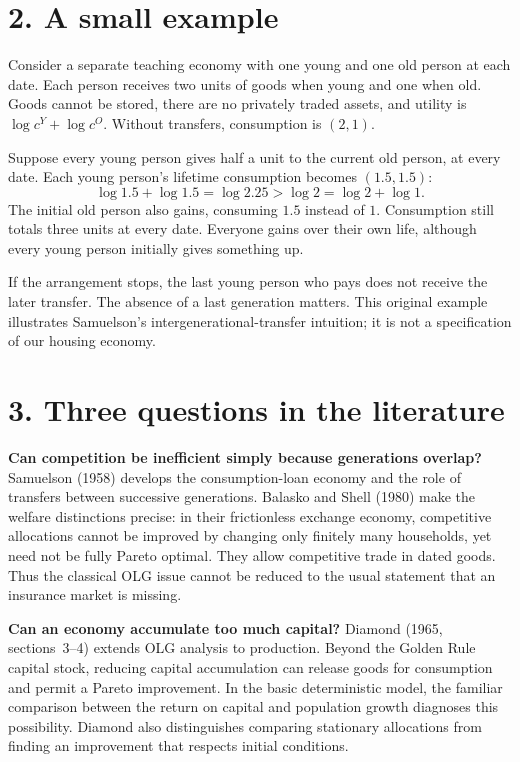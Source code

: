 \documentclass[11pt]{article}
\begin{document}
\section*{2. A small example}

Consider a separate teaching economy with one young and one old person at
each date. Each person receives two units of goods when young and one when
old. Goods cannot be stored, there are no privately traded assets, and utility
is $\log c^Y+\log c^O$. Without transfers, consumption is $(2,1)$.

Suppose every young person gives half a unit to the current old person, at
every date. Each young person's lifetime consumption becomes $(1.5,1.5)$:
\[
\log 1.5+\log 1.5=\log 2.25>\log 2=\log 2+\log 1.
\]
The initial old person also gains, consuming $1.5$ instead of $1$. Consumption
still totals three units at every date. Everyone gains over their own life,
although every young person initially gives something up.

If the arrangement stops, the last young person who pays does not receive
the later transfer. The absence of a last generation matters. This original
example illustrates Samuelson's intergenerational-transfer intuition; it is
not a specification of our housing economy.

\newpage
\section*{3. Three questions in the literature}

\textbf{Can competition be inefficient simply because generations overlap?}
Samuelson (1958) develops the consumption-loan economy and the role of transfers
between successive generations. Balasko and Shell (1980) make the welfare
distinctions precise: in their frictionless exchange economy, competitive
allocations cannot be improved by changing only finitely many households,
yet need not be fully Pareto optimal. They allow competitive trade in dated
goods. Thus the classical OLG issue cannot be reduced to the usual statement
that an insurance market is missing.

\textbf{Can an economy accumulate too much capital?}
Diamond (1965, sections~3--4) extends OLG analysis to production. Beyond the
Golden Rule capital stock, reducing capital accumulation can release goods
for consumption and permit a Pareto improvement. In the basic deterministic
model, the familiar comparison between the return on capital and population
growth diagnoses this possibility. Diamond also distinguishes comparing
stationary allocations from finding an improvement that respects initial
conditions.
\end{document}

